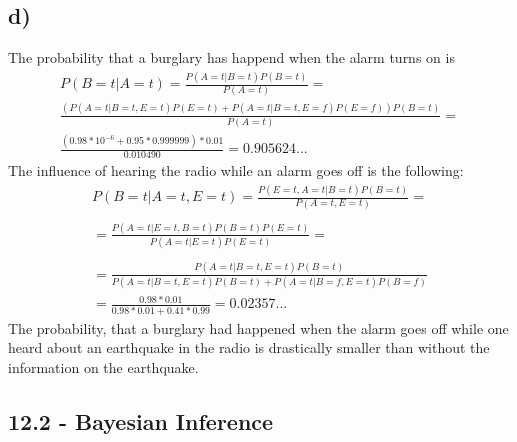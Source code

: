 \documentclass[11pt,a4paper]{article}
\begin{document}
\subsection*{d)}
The probability that a burglary has happend when the alarm turns on is
\begin{equation*}
\begin{split}
  P(B=t|A=t) = \frac{P(A=t|B=t)P(B=t)}{P(A=t)}=\\
  \frac{(P(A=t|B=t,E=t)P(E=t)+P(A=t|B=t,E=f)P(E=f))P(B=t)}{P(A=t)}=\\
  \frac{(0.98*10^{-6}+0.95*0.999999)*0.01}{0.010490}=0.905624...
  \end{split}
\end{equation*}
The influence of hearing the radio while an alarm goes off is the following:
\begin{equation*}
  \begin{split}
  P(B=t|A=t,E=t)  = \frac{P(E=t, A=t | B=t)P(B=t)}{P(A=t,E=t)}= \\
  \\
  =  \frac{P(A=t |E=t, B=t)P(B=t)P(E=t)}{P(A=t|E=t)P(E=t)}= \\
  \\
  =  \frac{P(A=t| B=t, E=t)P(B=t)}{P(A=t|B=t,E=t)P(B=t)+P(A=t|B=f,E=t)P(B=f)} \\
  = \frac{0.98*0.01}{0.98*0.01+0.41*0.99}=0.02357...
  \end{split}
\end{equation*}
The probability, that a burglary had happened when the alarm goes off while one heard about an earthquake in the radio is drastically smaller than without the information on the earthquake.

\subsection*{12.2 - Bayesian Inference}
\end{document}
